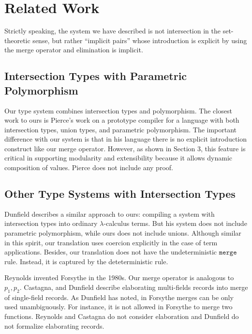 \section{Related Work}

Strictly speaking, the system we have described is not intersection in the
set-theoretic sense, but rather ``implicit pairs'' whose introduction is
explicit by using the merge operator and elimination is implicit.

\subsection{Intersection Types with Parametric Polymorphism}

Our type system combines intersection types and polymorphism. The closest work
to ours is Pierce\cite{pierce1991programming}'s work on a prototype compiler for
a language with both intersection types, union types, and parametric
polymorphism. The important difference with our system is that in his language
there is no explicit introduction construct like our merge operator. However, as
shown in Section 3, this feature is critical in supporting modularity and
extensibility because it allows dynamic composition of values. Pierce does not
include any proof.

\subsection{Other Type Systems with Intersection Types}


Dunfield \cite{dunfield2014elaborating} describes a similar approach to ours:
compiling a system with intersection types into ordinary $\lambda$-calculus
terms. But his system does not include parametric polymorphism, while ours does
not include unions. Although similar in this spirit, our translation uses
coercion explicitly in the case of term applications. Besides, our translation
does not have the undeterministic $ \texttt{merge} $ rule. Instead, it is
captured by the deteterministic  rule.

Reynolds invented Forsythe in the 1980s. Our merge operator is analogous to
$ p_1, p_2 $. Castagna, and Dunfield describe elaborating multi-fields records
into merge of single-field records. As Dunfield has noted, in Forsythe merges
can be only used unambiguously. For instance, it is not allowed in Forsythe to
merge two functions. Reynolds and Castagna do not consider elaboration and
Dunfield do not formalize elaborating records.

